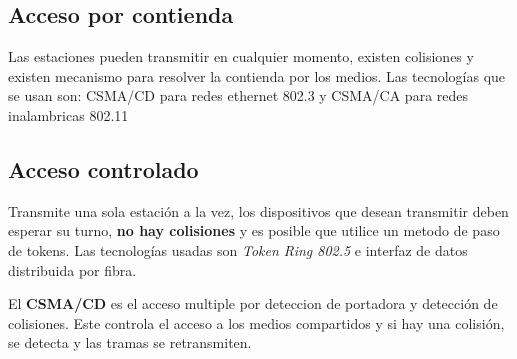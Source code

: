 \subsection{Acceso por contienda}
Las estaciones pueden transmitir en cualquier momento, existen colisiones y existen mecanismo para resolver la contienda por los medios.
Las tecnologías que se usan son: CSMA/CD para redes ethernet 802.3 y CSMA/CA para redes inalambricas 802.11
\subsection{Acceso controlado}
Transmite una sola estación a la vez, los dispositivos que desean transmitir deben esperar su turno, \textbf{no hay colisiones} y es posible que utilice un metodo de paso de tokens.
Las tecnologías usadas son \textit{Token Ring 802.5} e interfaz de datos distribuida por fibra.

El \textbf{CSMA/CD} es el acceso multiple por deteccion de portadora y detección de colisiones. Este controla el acceso a los medios compartidos y si hay una colisión, se detecta y las tramas se retransmiten.


